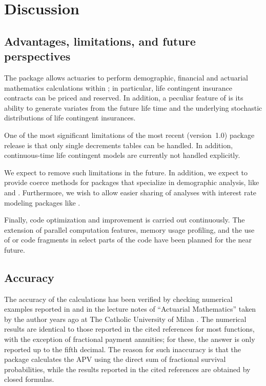 \documentclass[nojss]{jss}
\begin{document}
\section{Discussion}\label{sec:discussion}
\subsection{Advantages, limitations, and future perspectives}

The  package allows actuaries to perform
demographic, financial and actuarial mathematics calculations within
; in particular, life contingent insurance contracts can
be priced and reserved. In addition, a peculiar feature of
 is its ability to generate variates from the
future life time and the underlying stochastic distributions of life
contingent insurances.

One of the most significant limitations of the most recent
(version~1.0)  package release is that only
single decrements tables can be handled.  In addition, continuous-time
life contingent models are currently not handled explicitly.

We expect to remove such limitations in the future. In addition, we
expect to provide coerce methods for packages that specialize in
demographic analysis, like  and
. Furthermore, we wish to allow easier sharing of
analyses with interest rate modeling packages like .

Finally, code optimization and improvement is carried out
continuously. The extension of parallel computation features, memory
usage profiling, and the use of  or  code
fragments in select parts of the code have been planned for the near
future.

\subsection{Accuracy}\label{sec:disclaimer}

The accuracy of the calculations has been verified by checking
numerical examples reported in \cite{bowers1997actuarial} and in the
lecture notes of ``Actuarial Mathematics'' taken by the author years
ago at The Catholic University of Milan \citep{mazzoleni2000appunti}.
The numerical results are identical to those reported in the cited
references for most functions, with the exception of fractional
payment annuities; for these, the answer is only reported up to the
fifth decimal. The reason for such inaccuracy is that the package
calculates the APV using the direct sum of fractional survival
probabilities, while the results reported in the cited references are
obtained by closed formulas.
\end{document}
